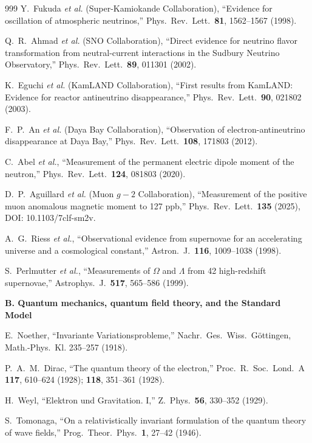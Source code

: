 \begin{thebibliography}{999}
Y.~Fukuda \emph{et al.} (Super-Kamiokande Collaboration),
``Evidence for oscillation of atmospheric neutrinos,''
Phys.\ Rev.\ Lett.\ \textbf{81}, 1562--1567 (1998).

Q.~R.~Ahmad \emph{et al.} (SNO Collaboration),
``Direct evidence for neutrino flavor transformation from neutral-current
interactions in the Sudbury Neutrino Observatory,''
Phys.\ Rev.\ Lett.\ \textbf{89}, 011301 (2002).

K.~Eguchi \emph{et al.} (KamLAND Collaboration),
``First results from KamLAND: Evidence for reactor antineutrino disappearance,''
Phys.\ Rev.\ Lett.\ \textbf{90}, 021802 (2003).

F.~P.~An \emph{et al.} (Daya Bay Collaboration),
``Observation of electron-antineutrino disappearance at Daya Bay,''
Phys.\ Rev.\ Lett.\ \textbf{108}, 171803 (2012).

C.~Abel \emph{et al.},
``Measurement of the permanent electric dipole moment of the neutron,''
Phys.\ Rev.\ Lett.\ \textbf{124}, 081803 (2020).

D.~P.~Aguillard \emph{et al.} (Muon $g-2$ Collaboration),
``Measurement of the positive muon anomalous magnetic moment to 127 ppb,''
Phys.\ Rev.\ Lett.\ \textbf{135} (2025), DOI: 10.1103/7clf-sm2v.

A.~G.~Riess \emph{et al.},
``Observational evidence from supernovae for an accelerating universe and a
cosmological constant,'' Astron.\ J.\ \textbf{116}, 1009--1038 (1998).

S.~Perlmutter \emph{et al.},
``Measurements of $\Omega$ and $\Lambda$ from 42 high-redshift supernovae,''
Astrophys.\ J.\ \textbf{517}, 565--586 (1999).

\item[]\textbf{B. Quantum mechanics, quantum field theory, and the Standard Model}

E.~Noether,
``Invariante Variationsprobleme,''
Nachr.\ Ges.\ Wiss.\ G\"ottingen, Math.-Phys.\ Kl. 235--257 (1918).

P.~A.~M.~Dirac,
``The quantum theory of the electron,''
Proc.\ R.\ Soc.\ Lond.\ A \textbf{117}, 610--624 (1928); \textbf{118},
351--361 (1928).

H.~Weyl,
``Elektron und Gravitation. I,''
Z.\ Phys.\ \textbf{56}, 330--352 (1929).

S.~Tomonaga,
``On a relativistically invariant formulation of the quantum theory of wave
fields,'' Prog.\ Theor.\ Phys.\ \textbf{1}, 27--42 (1946).


\end{thebibliography}
